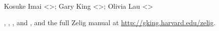 \begin{Author}\relax
Kosuke Imai <>; Gary King
<>; Olivia Lau <>
\end{Author}
\begin{SeeAlso}\relax
{}, , ,
and , and the full Zelig manual at
\url{http://gking.harvard.edu/zelig}.
\end{SeeAlso}


